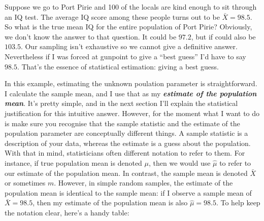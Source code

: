 \documentclass[
]{book}
\newenvironment{Shaded}{\begin{snugshade}}{\end{snugshade}}
\newcommand{\AttributeTok}[1]{\textcolor[rgb]{0.77,0.63,0.00}{#1}}
\newcommand{\ConstantTok}[1]{\textcolor[rgb]{0.00,0.00,0.00}{#1}}
\newcommand{\FunctionTok}[1]{\textcolor[rgb]{0.00,0.00,0.00}{#1}}
\newcommand{\NormalTok}[1]{#1}
\newcommand{\SpecialCharTok}[1]{\textcolor[rgb]{0.00,0.00,0.00}{#1}}
\newcommand{\StringTok}[1]{\textcolor[rgb]{0.31,0.60,0.02}{#1}}
\begin{document}
Suppose we go to Port Pirie and 100 of the locals are kind enough to sit through an IQ test. The average IQ score among these people turns out to be \(\bar{X}=98.5\). So what is the true mean IQ for the entire population of Port Pirie? Obviously, we don't know the answer to that question. It could be \(97.2\), but if could also be \(103.5\). Our sampling isn't exhaustive so we cannot give a definitive answer. Nevertheless if I was forced at gunpoint to give a ``best guess'' I'd have to say \(98.5\). That's the essence of statistical estimation: giving a best guess.

In this example, estimating the unknown poulation parameter is straightforward. I calculate the sample mean, and I use that as my \textbf{\emph{estimate of the population mean}}. It's pretty simple, and in the next section I'll explain the statistical justification for this intuitive answer. However, for the moment what I want to do is make sure you recognise that the sample statistic and the estimate of the population parameter are conceptually different things. A sample statistic is a description of your data, whereas the estimate is a guess about the population. With that in mind, statisticians often different notation to refer to them. For instance, if true population mean is denoted \(\mu\), then we would use \(\hat\mu\) to refer to our estimate of the population mean. In contrast, the sample mean is denoted \(\bar{X}\) or sometimes \(m\). However, in simple random samples, the estimate of the population mean is identical to the sample mean: if I observe a sample mean of \(\bar{X} = 98.5\), then my estimate of the population mean is also \(\hat\mu = 98.5\). To help keep the notation clear, here's a handy table:

\begin{Shaded}
\end{Shaded}
\end{document}
